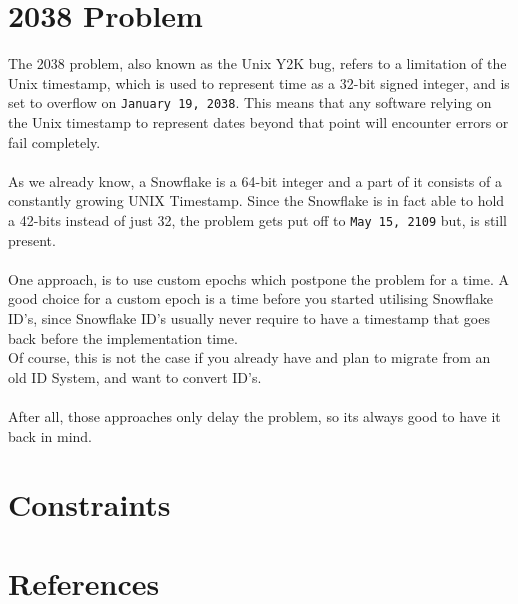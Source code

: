 \documentclass{article}
\newcommand{\code}[1]{\colorbox{cverbbg}{\texttt{#1}}}
\newcommand{\hn}[0]{\hfill \\}
\begin{document}
\section{2038 Problem}
The 2038 problem, also known as the Unix Y2K bug, refers to a limitation of the
Unix timestamp, which is used to represent time as a 32-bit signed integer, and
is set to overflow on \code{January 19, 2038}. This means that any software
relying on the Unix timestamp to represent dates beyond that point will
encounter errors or fail completely. \\
\hn{}
As we already know, a Snowflake is a 64-bit integer and a part of it consists
of a constantly growing UNIX Timestamp. Since the Snowflake is in fact able to
hold a 42-bits instead of just 32, the problem gets put off to \code{May 15,
    2109} but, is still present. \\
\hn{}
One approach, is to use custom epochs which postpone the problem for a time. A
good choice for a custom epoch is a time before you started utilising Snowflake
ID's, since Snowflake ID's usually never require to have a timestamp that goes
back before the implementation time. \\
Of course, this is not the case if you already have and plan to migrate from an
old ID System, and want to convert ID's. \\
\hn{}
After all, those approaches only delay the problem, so its always good to have
it back in mind.

\section{Constraints}
\section{References}
\end{document}
